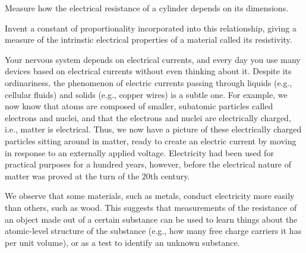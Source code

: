\label{lab:resistivity}

\apparatus
{}

\begin{goals}

\item[] Measure how the electrical resistance of a cylinder depends on its dimensions.

\item[] Invent a constant of proportionality incorporated into this relationship, giving a measure of the intrinstic electrical properties of a material
called its resistivity.
\end{goals}

\introduction

Your nervous system depends on electrical currents, and
every day you use many devices based on electrical currents
without even thinking about it. Despite its ordinariness,
the phenomenon of electric currents passing through liquids
(e.g., cellular fluids) and solids (e.g., copper wires) is a
subtle one. For example, we now know that atoms are composed
of smaller, subatomic particles called electrons and nuclei,
and that the electrons and nuclei are electrically charged,
i.e., matter is electrical. Thus, we now have a picture of
these electrically charged particles sitting around in
matter, ready to create an electric current by moving in
response to an externally applied voltage. Electricity had
been used for practical purposes for a hundred years,
however, before the electrical nature of matter was proved
at the turn of the 20th century.

We observe that some materials, such as metals, conduct electricity
more easily than others, such as wood. This suggests that measurements
of the resistance of an object made out of a certain substance can be
used to learn things about the atomic-level structure of the substance
(e.g., how many free charge carriers it has per unit volume), or
as a test to identify an unknown substance.


